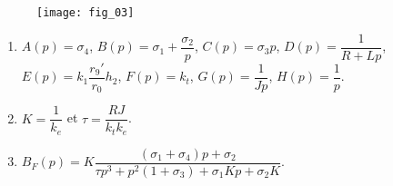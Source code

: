 \ifprof
\else
\begin{figure}[!h]
\texttt{[image: fig\_03]}
\end{figure}
\fi


\ifprof
\else

\begin{solution}
\begin{enumerate}
\item 
$A(p)=\sigma_4$,
$B(p)=\sigma_1 + \dfrac{\sigma_2}{p}$, 
$C(p)=\sigma_3 p$, 
$D(p) = \dfrac{1}{R+Lp}$, 
$E(p)= k_1 \dfrac{r_9'}{r_0}h_2 $, 
$F(p)=k_t$, 
$G(p)=\dfrac{1}{Jp}$, 
$H(p)=\dfrac{1}{p}$.
\item $K = \dfrac{1}{k_e}$ et $\tau = \dfrac{RJ}{k_t k_e}$.
\item $B_F(p) = K \dfrac{\left(\sigma_1+ \sigma_4 \right) p + \sigma_2 }{ \tau p^3 + p^2\left(1+\sigma_3 \right)  + \sigma_1 K p + \sigma_2 K  }$.
\end{enumerate}
\end{solution}


\fi